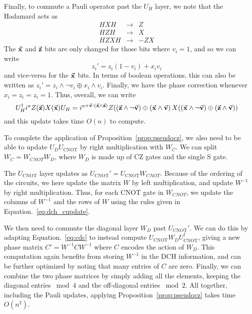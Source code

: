 Finally, to commute a Pauli operator past the $U_{H}$ layer, we note that the Hadamard acts as
\[
\begin{array}{rcc}
HXH & \rightarrow &Z\\
HZH & \rightarrow &X\\
HZXH & \rightarrow &-ZX
\end{array}
\]
The $\va{x}$ and $\va{z}$ bits are only changed for those bits where $v_{i}=1$, and so we can write
\[z_{i}' = z_{i}(1-v_{i}) + x_{i}v_{i}\]
and vice-versa for the $\va{x}$ bits. In terms of boolean operations, this can also be written as $z_{i}'= z_{i}\wedge\neg v_{i} \oplus x_{i}\wedge v_{i}$. Finally, we have the phase correction whenever $x_{i}=z_{i}=z_{i}=1$. Thus, overall, we can write
\begin{equation}
U_{H}^{\dagger}i^{a}Z(\va{z})X(\va{x})U_{H} = i^{a+\va{v}\cdot\left(\va{x}\wedge \va{z}\right)}Z(\left(\va{z}\wedge\neg \va{v}\right) \oplus \left(\va{x}\wedge \va{v}\right)X(\left(\va{x}\wedge \neg\va{v}\right)\oplus \left(\va{z}\wedge\va{v}\right))
\label{eq:dch_hupdate}
\end{equation}
and this update takes time $O(n)$ to compute.\par
To complete the application of Proposition~\ref{prop:pseudocz}, we also need to be able to update $U_{D}U_{\text{CNOT}}$ by right multiplication with $W_{C}$. We can split $W_{C}=W_{CNOT}W_{D}$, where $W_{D}$ is made up of CZ gates and the single S gate.\par
The $U_{\text{CNOT}}$ layer updates as $U_{\text{CNOT}}'=U_{\text{CNOT}}W_{CNOT}$. Because of the ordering of the circuits, we here update the matrix $W$ by left multiplication, and update $W^{-1}$ by right multiplication. Thus, for each CNOT gate in $W_{CNOT}$, we update the columns of $W^{-1}$ and the rows of $W$ using the rules given in Equation.~\ref{eq:dch_cupdate}.\par
We then need to commute the diagonal layer $W_{D}$ past $U_{\text{CNOT}}'$. We can do this by adapting Equation.~\ref{eq:cdc} to instead compute $U_{\text{CNOT}}W_{D}U_{\text{CNOT}}^{\dagger}$, giving a new phase matrix $C'=W^{-1}CW^{-1}$ where $C$ encodes the action of $W_{D}$. This computation again benefits from storing $W^{-1}$ in the DCH information, and can be further optimized by noting that many entries of $C$ are zero. Finally, we can combine the two phase matrices by simply adding all the elements, keeping the diagonal entries $\bmod 4$ and the off-diagonal entries $\bmod 2$. All together, including the Pauli updates, applying Proposition~\ref{prop:pseudocz} takes time $O(n^2)$.
